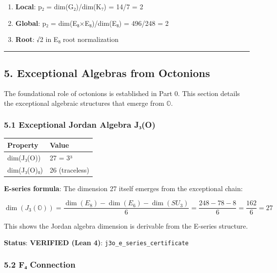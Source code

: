 \documentclass[11pt,a4paper]{article}
\begin{document}
{{{{{{{\begin{enumerate}


\item
  \textbf{Local}: p₂ = dim(G₂)/dim(K₇) = 14/7 = 2
\item
  \textbf{Global}: p₂ = dim(E₈×E₈)/dim(E₈) = 496/248 = 2
\item
  \textbf{Root}: √2 in E₈ root normalization
\end{enumerate}

\begin{center}\rule{0.5\linewidth}{0.5pt}\end{center}

\subsection{5. Exceptional Algebras from Octonions}\label{exceptional-algebras-from-octonions}

The foundational role of octonions is established in Part 0. This section details the exceptional algebraic structures that emerge from $\mathbb{O}$.

\subsubsection{5.1 Exceptional Jordan Algebra J₃(O)}\label{exceptional-jordan-algebra-jux2083o}

{\def\LTcaptype{none} %
\begin{longtable}[]{@{}ll@{}}
\toprule\noalign{}
Property & Value \\
\midrule\noalign{}
\endhead
\bottomrule\noalign{}
\endlastfoot
dim(J₃(O)) & 27 = 3³ \\
dim(J₃(O)₀) & 26 (traceless) \\
\end{longtable}
\textbf{E-series formula}: The dimension 27 itself emerges from the exceptional chain:

\[\dim(J_3(\mathbb{O})) = \frac{\dim(E_8) - \dim(E_6) - \dim(SU_3)}{6} = \frac{248 - 78 - 8}{6} = \frac{162}{6} = 27\]

This shows the Jordan algebra dimension is derivable from the E-series structure.

\textbf{Status}: \textbf{VERIFIED (Lean 4)}: \texttt{j3o\_e\_series\_certificate}

\subsubsection{5.2 F₄ Connection}\label{fux2084-connection}

}}}}}}}}
\end{document}
